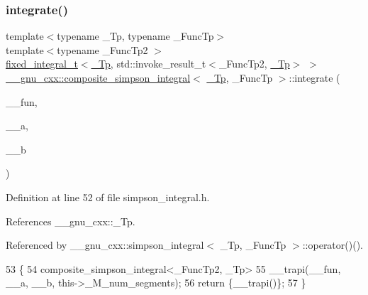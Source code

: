 \subsubsection{\texorpdfstring{integrate()}{integrate()}}
{\footnotesize\ttfamily template$<$typename \+\_\+\+Tp, typename \+\_\+\+Func\+Tp$>$ \\
template$<$typename \+\_\+\+Func\+Tp2 $>$ \\
\hyperlink{struct____gnu__cxx_1_1fixed__integral__t}{fixed\+\_\+integral\+\_\+t}$<$\hyperlink{namespace____gnu__cxx_a3b19a9c800ca194374ef9172290f7d79}{\+\_\+\+Tp}, std\+::invoke\+\_\+result\+\_\+t$<$\+\_\+\+Func\+Tp2, \hyperlink{namespace____gnu__cxx_a3b19a9c800ca194374ef9172290f7d79}{\+\_\+\+Tp}$>$ $>$ \hyperlink{class____gnu__cxx_1_1composite__simpson__integral}{\+\_\+\+\_\+gnu\+\_\+cxx\+::composite\+\_\+simpson\+\_\+integral}$<$ \hyperlink{namespace____gnu__cxx_a3b19a9c800ca194374ef9172290f7d79}{\+\_\+\+Tp}, \+\_\+\+Func\+Tp $>$\+::integrate (\begin{DoxyParamCaption}\item[{\+\_\+\+Func\+Tp2}]{\+\_\+\+\_\+fun,  }\item[{\hyperlink{namespace____gnu__cxx_a3b19a9c800ca194374ef9172290f7d79}{\+\_\+\+Tp}}]{\+\_\+\+\_\+a,  }\item[{\hyperlink{namespace____gnu__cxx_a3b19a9c800ca194374ef9172290f7d79}{\+\_\+\+Tp}}]{\+\_\+\+\_\+b }\end{DoxyParamCaption})\hspace{0.3cm}{\ttfamily [inline]}}



Definition at line 52 of file simpson\+\_\+integral.\+h.



References \+\_\+\+\_\+gnu\+\_\+cxx\+::\+\_\+\+Tp.



Referenced by \+\_\+\+\_\+gnu\+\_\+cxx\+::simpson\+\_\+integral$<$ \+\_\+\+Tp, \+\_\+\+Func\+Tp $>$\+::operator()().


\begin{DoxyCode}
53         \{
54           composite\_simpson\_integral<\_FuncTp2, \_Tp>
55             \_\_trapi(\_\_fun, \_\_a, \_\_b, this->\_M\_num\_segments);
56           \textcolor{keywordflow}{return} \{\_\_trapi()\};
57         \}
\end{DoxyCode}
\mbox{\label{class____gnu__cxx_1_1composite__simpson__integral_a7c60338016d2c10eddc8bd9b8dfd3264}} 
